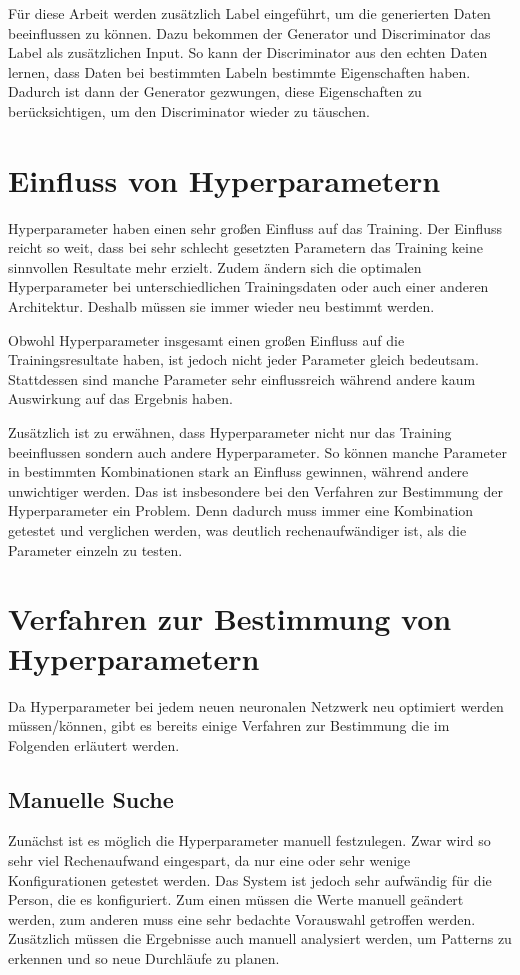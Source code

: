 Für diese Arbeit werden zusätzlich Label eingeführt, um die generierten Daten beeinflussen zu können. 
Dazu bekommen der Generator und Discriminator das Label als zusätzlichen Input.
So kann der Discriminator aus den echten Daten lernen, dass Daten bei bestimmten Labeln bestimmte Eigenschaften haben.
Dadurch ist dann der Generator gezwungen, diese Eigenschaften zu berücksichtigen, um den Discriminator wieder zu täuschen.
\newline



\section{Einfluss von Hyperparametern}
Hyperparameter haben einen sehr großen Einfluss auf das Training.
Der Einfluss reicht so weit, dass bei sehr schlecht gesetzten Parametern das Training keine sinnvollen Resultate mehr erzielt.
Zudem ändern sich die optimalen Hyperparameter bei unterschiedlichen Trainingsdaten oder auch einer anderen Architektur.
Deshalb müssen sie immer wieder neu bestimmt werden.

Obwohl Hyperparameter insgesamt einen großen Einfluss auf die Trainingsresultate haben, ist jedoch nicht jeder Parameter gleich bedeutsam.
Stattdessen sind manche Parameter sehr einflussreich während andere kaum Auswirkung auf das Ergebnis haben.

Zusätzlich ist zu erwähnen, dass Hyperparameter nicht nur das Training beeinflussen sondern auch andere Hyperparameter.
So können manche Parameter in bestimmten Kombinationen stark an Einfluss gewinnen, während andere unwichtiger werden.
Das ist insbesondere bei den Verfahren zur Bestimmung der Hyperparameter ein Problem.
Denn dadurch muss immer eine Kombination getestet und verglichen werden, was deutlich rechenaufwändiger ist, als die Parameter einzeln zu testen.

\section{Verfahren zur Bestimmung von Hyperparametern}
Da Hyperparameter bei jedem neuen neuronalen Netzwerk neu optimiert werden müssen/können, gibt es bereits einige Verfahren zur Bestimmung die im Folgenden erläutert werden.
\newline

\subsection{Manuelle Suche}
Zunächst ist es möglich die Hyperparameter manuell festzulegen.
Zwar wird so sehr viel Rechenaufwand eingespart, da nur eine oder sehr wenige Konfigurationen getestet werden.
Das System ist jedoch sehr aufwändig für die Person, die es konfiguriert.
Zum einen müssen die Werte manuell geändert werden, zum anderen muss eine sehr bedachte Vorauswahl getroffen werden.
Zusätzlich müssen die Ergebnisse auch manuell analysiert werden, um Patterns zu erkennen und so neue Durchläufe zu planen.

